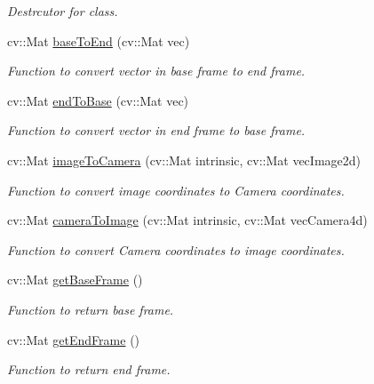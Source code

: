 \begin{DoxyCompactItemize}
\begin{DoxyCompactList}\small\item\em Destrcutor for class. \end{DoxyCompactList}\item 
cv\+::\+Mat \hyperlink{classTransformation_afcce8d7bce0b4760e90b2c9a4f33778b}{base\+To\+End} (cv\+::\+Mat vec)
\begin{DoxyCompactList}\small\item\em Function to convert vector in base frame to end frame. \end{DoxyCompactList}\item 
cv\+::\+Mat \hyperlink{classTransformation_ae06ef579b76564a33e5db35f7d617161}{end\+To\+Base} (cv\+::\+Mat vec)
\begin{DoxyCompactList}\small\item\em Function to convert vector in end frame to base frame. \end{DoxyCompactList}\item 
cv\+::\+Mat \hyperlink{classTransformation_a8a7c06d699c43a020069098aac504e27}{image\+To\+Camera} (cv\+::\+Mat intrinsic, cv\+::\+Mat vec\+Image2d)
\begin{DoxyCompactList}\small\item\em Function to convert image coordinates to Camera coordinates. \end{DoxyCompactList}\item 
cv\+::\+Mat \hyperlink{classTransformation_a9e7afec78535b499d99c8d55e08f91f1}{camera\+To\+Image} (cv\+::\+Mat intrinsic, cv\+::\+Mat vec\+Camera4d)
\begin{DoxyCompactList}\small\item\em Function to convert Camera coordinates to image coordinates. \end{DoxyCompactList}\item 
cv\+::\+Mat \hyperlink{classTransformation_a0536abd126af1fcffd0b7644ebf0b108}{get\+Base\+Frame} ()
\begin{DoxyCompactList}\small\item\em Function to return base frame. \end{DoxyCompactList}\item 
cv\+::\+Mat \hyperlink{classTransformation_aea3e04cbe0289fcd34b51c6541a23242}{get\+End\+Frame} ()
\begin{DoxyCompactList}\small\item\em Function to return end frame. \end{DoxyCompactList}\end{DoxyCompactItemize}


